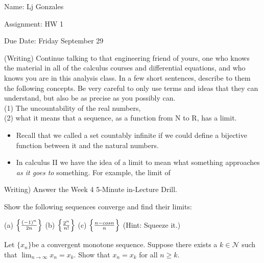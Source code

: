 \documentclass[11 pt]{article}
\begin{document}
    Name: Lj Gonzales

    Assignment: HW 1 

    Due Date: Friday September 29
    \break
\begin{problem}
(Writing) Continue talking to that engineering friend of yours, one who knows
the material in all of the calculus courses and differential equations, and who knows
you are in this analysis class. In a few short sentences, describe to them the following
concepts. Be very careful to only use terms and ideas that they can understand, but
also be as precise as you possibly can.\\
(1) The uncountability of the real numbers,\\
(2) what it means that a sequence, as a function from N to R, has a limit.
\end{problem}
\begin{solution}
\begin{itemize}
	\item Recall that we called a set countably infinite if we could define a bijective function between it and the natural numbers.
	\item In calculus II we have the idea of a limit to mean what something approaches \emph{as it goes to} something. For example, the limit of
\end{itemize}
\end{solution} 
\pagebreak
\begin{problem}
Writing) Answer the Week 4 5-Minute in-Lecture Drill.
\end{problem}
\begin{solution}
\end{solution}
\pagebreak
\begin{problem}
Show the following sequences converge and find their limits:\\
\begin{center}
(a) $\Bigl\{\frac{(-1)^n}{2n}\Bigr\}$ (b) $\Bigl\{\frac{2^n}{n!}\Bigr\}$ (c) $\Bigl\{\frac{n-cosn}{n}\Bigr\}$ (Hint: Squeeze it.)
\end{center}
\end{problem}
\begin{solution}
\end{solution}
\pagebreak
\begin{problem}
Let $\{x_n\}$be a convergent monotone sequence. Suppose there exists a $k\in\mathcal{N}$ such that $\lim_{n\to\infty}x_n=x_k$. Show that $x_n=x_k$ for all $n\geq k$.
\end{problem}
\begin{solution}
\end{solution}
\end{document}
